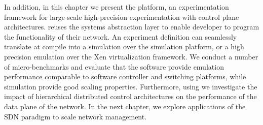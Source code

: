In addition, in this chapter we present the \sdnsim platform, an experimentation
framework for large-scale high-precision experimentation with control plane
architectures. \sdnsim reuses the \mirage systems abstraction layer to enable
developer to program the functionality of their network. An \sdnsim experiment
definition can seamlessly translate at compile into a simulation over the 
simulation platform, or a high precision emulation over the Xen virtualization
framework. We conduct a number of micro-benchmarks and evaluate that the
software provide emulation performance comparable to software \of controller and
switching platforms, while \sdnsim simulation provide good scaling properties.
Furthermore, using \sdnsim we investigate the impact of hierarchical distributed
control architectures on the performance of the data plane of the network.  In
the next chapter, we explore applications of the SDN paradigm to scale network
management. 
